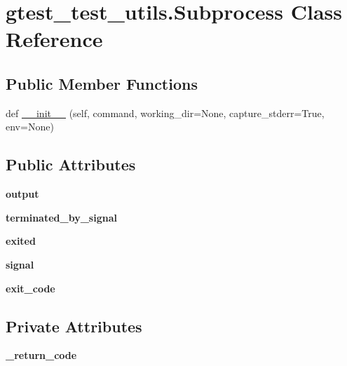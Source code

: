 \hypertarget{classgtest__test__utils_1_1_subprocess}{}\section{gtest\+\_\+test\+\_\+utils.\+Subprocess Class Reference}
\label{classgtest__test__utils_1_1_subprocess}
\subsection*{Public Member Functions}
\begin{DoxyCompactItemize}
\item 
def \mbox{\hyperlink{classgtest__test__utils_1_1_subprocess_a452a9e7d9988cc96e71b6fa09bbaddca}{\+\_\+\+\_\+init\+\_\+\+\_\+}} (self, command, working\+\_\+dir=None, capture\+\_\+stderr=True, env=None)
\end{DoxyCompactItemize}
\subsection*{Public Attributes}
\begin{DoxyCompactItemize}
\item 
\mbox{\label{classgtest__test__utils_1_1_subprocess_a170f722b867e51f3e97b5b60399988cf}} 
{\bfseries output}
\item 
\mbox{\label{classgtest__test__utils_1_1_subprocess_a9654b9eddd43c93acf66d5c7b0026fca}} 
{\bfseries terminated\+\_\+by\+\_\+signal}
\item 
\mbox{\label{classgtest__test__utils_1_1_subprocess_a020b5fa8268b9eaf1c4a57cbd53c104d}} 
{\bfseries exited}
\item 
\mbox{\label{classgtest__test__utils_1_1_subprocess_af083cd9621a5d5346ffe800191678ea3}} 
{\bfseries signal}
\item 
\mbox{\label{classgtest__test__utils_1_1_subprocess_a01acee4476fd01ccf017d1351cf46c08}} 
{\bfseries exit\+\_\+code}
\end{DoxyCompactItemize}
\subsection*{Private Attributes}
\begin{DoxyCompactItemize}
\item 
\mbox{\label{classgtest__test__utils_1_1_subprocess_ac62600a9ac66eea7d81b37ceb5132bd4}} 
{\bfseries \+\_\+return\+\_\+code}
\end{DoxyCompactItemize}


